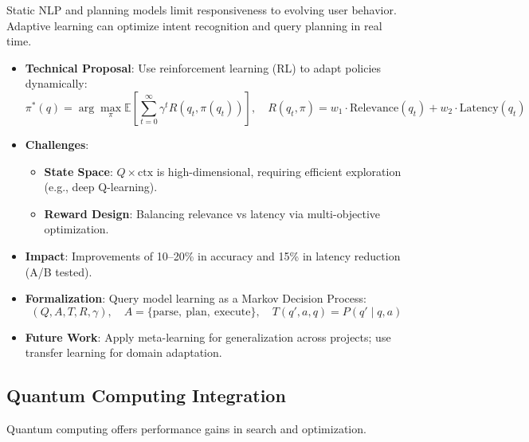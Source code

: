 \documentclass[11pt]{article}
\begin{document}
Static NLP and planning models limit responsiveness to evolving user behavior. Adaptive learning can optimize intent recognition and query planning in real time.

\begin{itemize}
    \item \textbf{Technical Proposal}: Use reinforcement learning (RL) to adapt policies dynamically:
        \[
        \pi^*(q) = \arg\max_{\pi} \mathbb{E} \left[ \sum_{t=0}^{\infty} \gamma^t R(q_t, \pi(q_t)) \right], \quad R(q_t, \pi) = w_1 \cdot \text{Relevance}(q_t) + w_2 \cdot \text{Latency}(q_t)
        \]

    \item \textbf{Challenges}:
        \begin{itemize}
            \item \textbf{State Space}: $Q \times \text{ctx}$ is high-dimensional, requiring efficient exploration (e.g., deep Q-learning).
            \item \textbf{Reward Design}: Balancing relevance vs latency via multi-objective optimization.
        \end{itemize}

    \item \textbf{Impact}: Improvements of 10–20\% in accuracy and 15\% in latency reduction (A/B tested).

    \item \textbf{Formalization}: Query model learning as a Markov Decision Process:
        \[
        (Q, A, T, R, \gamma), \quad A = \{ \text{parse},\ \text{plan},\ \text{execute} \}, \quad T(q', a, q) = P(q' \mid q, a)
        \]

    \item \textbf{Future Work}: Apply meta-learning for generalization across projects; use transfer learning for domain adaptation.
\end{itemize}

\subsection{Quantum Computing Integration}
\label{subsec:quantum_integration}

Quantum computing offers performance gains in search and optimization.
\end{document}
